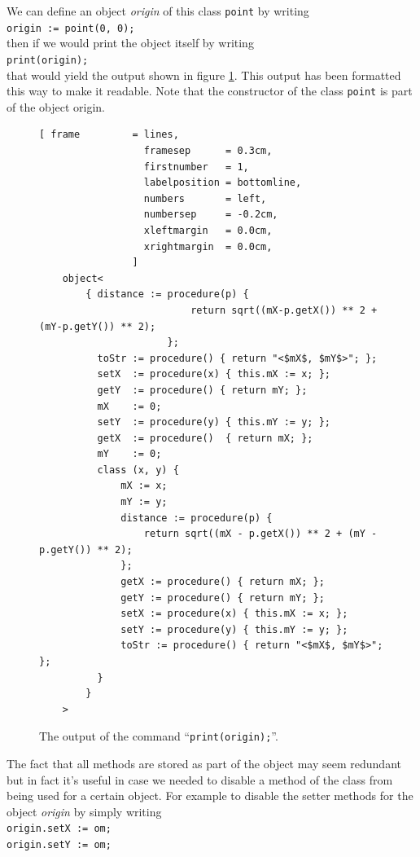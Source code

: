 \documentclass[11pt]{report}
\begin{document}
We can define an object \textsl{origin} of this class
\texttt{point} by writing
\\[0.2cm]
\hspace*{1.3cm}
\texttt{origin := point(0, 0);}
\\[0.2cm]
then if we would print the object itself by writing 
\\[0.2cm]
\hspace*{1.3cm}
\texttt{print(origin);}
\\[0.2cm]
that would yield the output shown in figure \ref{fig:print_origin}. This output has been formatted this way to make it readable. Note that the constructor of the class \texttt{point} is part of the object origin.

\begin{figure}[!ht]
\centering
\begin{Verbatim}[ frame         = lines, 
                  framesep      = 0.3cm, 
                  firstnumber   = 1,
                  labelposition = bottomline,
                  numbers       = left,
                  numbersep     = -0.2cm,
                  xleftmargin   = 0.0cm,
                  xrightmargin  = 0.0cm,
                ]
    object<
        { distance := procedure(p) { 
                          return sqrt((mX-p.getX()) ** 2 + (mY-p.getY()) ** 2); 
                      }; 
          toStr := procedure() { return "<$mX$, $mY$>"; }; 
          setX  := procedure(x) { this.mX := x; }; 
          getY  := procedure() { return mY; }; 
          mX    := 0; 
          setY  := procedure(y) { this.mY := y; }; 
          getX  := procedure()  { return mX; }; 
          mY    := 0; 
          class (x, y) { 
              mX := x; 
              mY := y; 
              distance := procedure(p) { 
                  return sqrt((mX - p.getX()) ** 2 + (mY - p.getY()) ** 2); 
              }; 
              getX := procedure() { return mX; };
              getY := procedure() { return mY; }; 
              setX := procedure(x) { this.mX := x; }; 
              setY := procedure(y) { this.mY := y; }; 
              toStr := procedure() { return "<$mX$, $mY$>"; }; 
          } 
        }
    >
\end{Verbatim}
\vspace*{-0.3cm}
\caption{The output of the command ``\texttt{print(origin);}''.}
\label{fig:print_origin}
\end{figure}

The fact that all methods are stored as part of the object may seem redundant but in fact it's useful in case we needed to disable a method of the class from being used for a certain object. For example to disable the setter methods for the object \textsl{origin} by simply writing
\\[0.2cm]
\hspace*{1.3cm}
\texttt{origin.setX := om;}
\\
\hspace*{1.3cm}
\texttt{origin.setY := om;}
\\[0.2cm]
\end{document}
